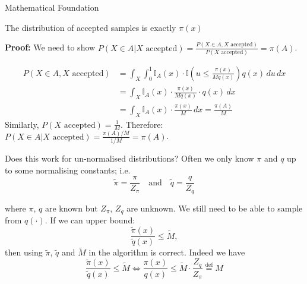 \begin{frame}{Mathematical Foundation}
	\begin{proposition}
		The distribution of accepted samples is exactly $\pi(x)$
	\end{proposition}
	\textbf{Proof:} We need to show $P(X \in A | X \text{ accepted}) = \frac{P(X \in A, X \text{ accepted})}{P(X \text{ accepted})} = \pi(A)$. 

	\begin{align*}
		P(X \in A, X \text{ accepted}) & = \int_X \int_0^1 \mathbb{I}_A(x) \cdot \mathbb{I}\left(u \leq \frac{\pi(x)}{M q(x)}\right) q(x) \, du \, dx \\
		                               & = \int_X \mathbb{I}_A(x) \cdot \frac{\pi(x)}{M q(x)} \cdot q(x) \, dx                                        \\
		                               & = \int_X \mathbb{I}_A(x) \cdot \frac{\pi(x)}{M} \, dx = \frac{\pi(A)}{M}
	\end{align*}
	Similarly, $P(X \text{ accepted}) = \frac{1}{M}$. Therefore: $P(X \in A | X \text{ accepted}) = \frac{\pi(A)/M}{1/M} = \pi(A)$.
\end{frame}

\begin{frame}{Does this work for un-normalised distributions?}
	Often we only know $\pi$ and $q$ up to some normalising constants; i.e.
	\begin{equation*}
		\tilde{\pi} = \frac{\pi}{Z_\pi} \quad \text{and} \quad \tilde{q} = \frac{q}{Z_q}
	\end{equation*}

	where $\pi$, $q$ are known but $Z_\pi$, $Z_q$ are unknown.
	We still need to be able to sample from $q(\cdot)$.
	If we can upper bound:
	\begin{equation*}
		\frac{\tilde{\pi}(x)}{\tilde{q}(x)} \leq \widetilde{M},
	\end{equation*}
	then using $\tilde{\pi}$, $\tilde{q}$ and $\widetilde{M}$ in the algorithm is correct.
	Indeed we have
	\begin{equation*}
		\frac{\tilde{\pi}(x)} {\tilde{q}(x)} \leq \widetilde{M} \iff
		\frac{\pi(x)}{q(x)} \leq \widetilde{M} \cdot \frac{Z_q}{Z_\pi} \overset{\text{def}}{=} M
	\end{equation*}
\end{frame}

